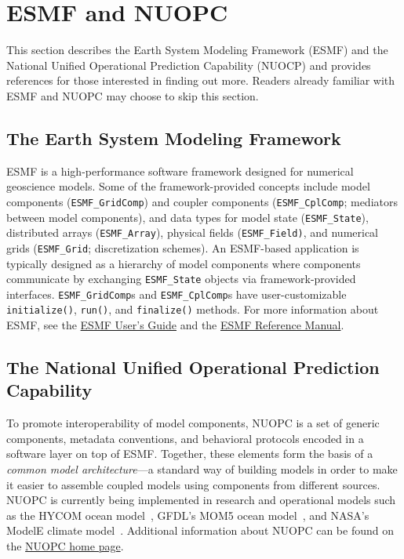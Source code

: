 \documentclass[oneside,11pt]{memoir}
\begin{document}
\chapter{ESMF and NUOPC}

This section describes the Earth System Modeling Framework (ESMF) and the National Unified Operational Prediction Capability (NUOCP) and provides references for those interested in finding out more. Readers already familiar with ESMF and NUOPC may choose to skip this section.

\section{The Earth System Modeling Framework}
ESMF is a high-performance software framework designed for numerical geoscience models. Some of the framework-provided concepts include model components (\texttt{ESMF\_GridComp}) and coupler components (\texttt{ESMF\_CplComp}; mediators between model components), and data types for model state (\texttt{ESMF\_State}), distributed arrays (\texttt{ESMF\_Array}), physical fields (\texttt{ESMF\_Field)}, and numerical grids (\texttt{ESMF\_Grid}; discretization schemes). An ESMF-based application is typically designed as a hierarchy of model components where components communicate by exchanging \texttt{ESMF\_State} objects via framework-provided interfaces. \texttt{ESMF\_GridComp}s and \texttt{ESMF\_CplComp}s have user-customizable \texttt{initialize()}, \texttt{run()}, and \texttt{finalize()} methods.  For more information about ESMF, see the \href{http://www.earthsystemmodeling.org/esmf_releases/public/last/ESMF_usrdoc/}{ESMF User's Guide} and the \href{http://www.earthsystemmodeling.org/esmf_releases/public/last/ESMF_refdoc/}{ESMF Reference Manual}.

\section{The National Unified Operational Prediction Capability}
To promote interoperability of model components, NUOPC is a set of generic components, metadata conventions, and behavioral protocols encoded in a software layer on top of ESMF. Together, these elements form the basis of a \emph{common model architecture}---a standard way of building models in order to make it easier to assemble coupled models using components from different sources. NUOPC is currently being implemented in research and operational models such as the HYCOM ocean model~\cite{hycom}, GFDL's MOM5 ocean model~\cite{mom5}, and NASA's ModelE climate model~\cite{modele}.  Additional information about NUOPC can be found on the \href{https://earthsystemcog.org/projects/nuopc/}{NUOPC home page}.
\end{document}
